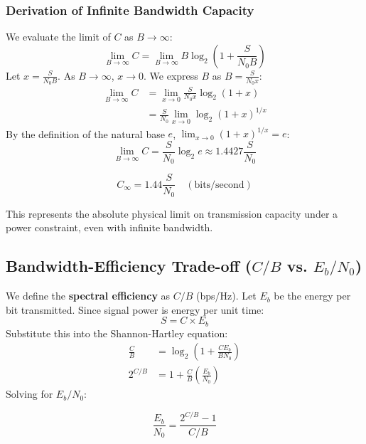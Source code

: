 \documentclass[12pt,a4paper]{article}
\begin{document}
\subsubsection{Derivation of Infinite Bandwidth Capacity}
We evaluate the limit of $C$ as $B \to \infty$:
\begin{equation*}
  \lim_{B \to \infty} C = \lim_{B \to \infty} B \log_2 \left( 1 + \frac{S}{N_0 B} \right)
\end{equation*}
Let $x = \frac{S}{N_0 B}$. As $B \to \infty$, $x \to 0$. We express $B$ as $B = \frac{S}{N_0 x}$:
\begin{align*}
  \lim_{B \to \infty} C &= \lim_{x \to 0} \frac{S}{N_0 x} \log_2 (1 + x) \\
  &= \frac{S}{N_0} \lim_{x \to 0} \log_2 (1 + x)^{1/x}
\end{align*}
By the definition of the natural base $e$, $\lim_{x \to 0} (1+x)^{1/x} = e$:
\begin{equation*}
  \lim_{B \to \infty} C = \frac{S}{N_0} \log_2 e \approx 1.4427 \frac{S}{N_0}
\end{equation*}
\begin{tcolorbox}[formulabox, title={\textbf{Infinite Bandwidth Capacity Limit}}]
\begin{equation}
  C_{\infty} = 1.44 \frac{S}{N_0} \quad (\text{bits/second})
\end{equation}
\end{tcolorbox}
This represents the absolute physical limit on transmission capacity under a power constraint, even with infinite bandwidth.

\subsection{Bandwidth-Efficiency Trade-off ($C/B$ vs. $E_b/N_0$)}
We define the \textbf{spectral efficiency} as $C/B$ (bps/Hz). Let $E_b$ be the energy per bit transmitted. Since signal power is energy per unit time:
\begin{equation*}
  S = C \times E_b
\end{equation*}
Substitute this into the Shannon-Hartley equation:
\begin{align*}
  \frac{C}{B} &= \log_2 \left( 1 + \frac{C E_b}{B N_0} \right) \\
  2^{C/B} &= 1 + \frac{C}{B} \left(\frac{E_b}{N_0}\right)
\end{align*}
Solving for $E_b/N_0$:
\begin{tcolorbox}[formulabox, title={\textbf{Bandwidth-Efficiency Relation}}]
\begin{equation}
  \frac{E_b}{N_0} = \frac{2^{C/B} - 1}{C/B}
\end{equation}
\end{tcolorbox}
\end{document}

